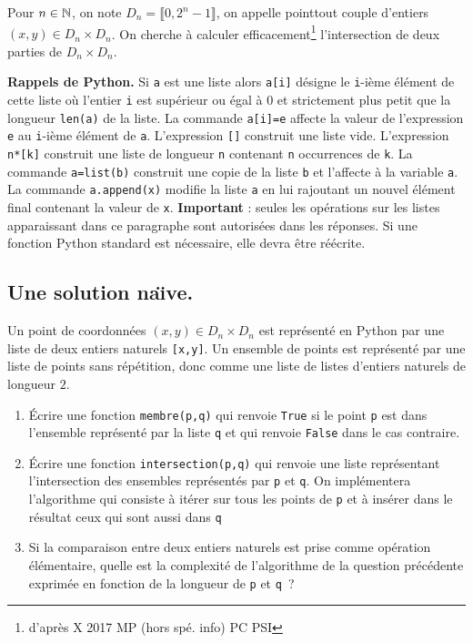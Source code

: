 Pour $n \in \mathbb{N}$, on note $D_n = \llbracket 0, 2^n -1 \rrbracket$, on appelle \og point\fg tout couple d'entiers $(x,y)\in D_n\times D_n$. On cherche \`a calculer efficacement\footnote{d'après X 2017 MP (hors spé. info) PC PSI} l'intersection de deux parties de $D_n\times D_n$.

{\bf Rappels de Python.}\newline
Si {\tt a} est une liste alors {\tt a[i]} d\'esigne le {\tt i}-i\`eme \'el\'ement de cette liste o\`u l'entier {\tt i} est sup\'erieur ou \'egal \`a $0$
et strictement plus petit que la longueur {\tt len(a)} de la liste.\newline
La commande {\tt a[i]=e} affecte la valeur de l'expression {\tt e} au {\tt i}-i\`eme \'el\'ement de {\tt a}.\newline
L'expression {\tt []} construit une liste vide.\newline
L'expression {\tt n*[k]} construit une liste de longueur {\tt n} contenant {\tt n} occurrences de {\tt k}.\newline
La commande {\tt a=list(b)} construit une copie de la liste {\tt b} et l'affecte \`a la variable {\tt a}.\newline
La commande {\tt a.append(x)} modifie la liste {\tt a} en lui rajoutant un nouvel \'el\'ement final contenant la valeur de {\tt x}.\newline
{\bf Important} : seules les op\'erations sur les listes apparaissant dans ce paragraphe sont autoris\'ees dans les r\'eponses. Si une fonction Python standard est n\'ecessaire, elle devra \^etre r\'e\'ecrite.

\subsection{Une solution na\"\i ve.}
Un point de coordonn\'ees $(x,y)\in D_n\times D_n$ est repr\'esent\'e en Python par une liste de deux entiers naturels {\tt [x,y]}.\newline
Un ensemble de points est repr\'esent\'e par une liste de points sans r\'ep\'etition, donc comme une liste de listes d'entiers naturels de longueur $2$.
\begin{enumerate}
\item \'Ecrire une fonction {\tt membre(p,q)} qui renvoie {\tt True} si le point {\tt p} est dans l'ensemble repr\'esent\'e par la liste {\tt q} et qui renvoie {\tt False} dans le cas contraire.
\item \'Ecrire une fonction {\tt intersection(p,q)} qui renvoie une liste repr\'esentant l'intersection des ensembles repr\'esent\'es par {\tt p} et {\tt q}. On impl\'ementera l'algorithme qui consiste \`a it\'erer sur tous les points de {\tt p} et \`a ins\'erer dans le r\'esultat ceux qui sont aussi dans {\tt q}
\item Si la comparaison entre deux entiers naturels est prise comme op\'eration \'el\'ementaire, quelle est la complexit\'e de l'algorithme de la question pr\'ec\'edente exprim\'ee en fonction de la longueur de {\tt p} et {\tt q}~?
\end{enumerate}

